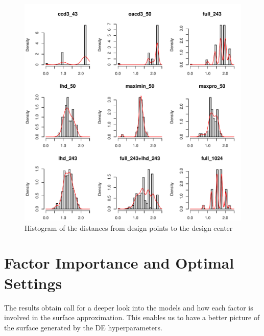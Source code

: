\documentclass [PhD] {package/uclathes}
\begin{document}
\begin{figure}%
    \centering
    \includegraphics{chapters/DE/pdfs/histogram}
    \caption{Histogram of the distances from  design points to the design center}
    \label{fig:distance}
\end{figure}


\section{Factor Importance and Optimal Settings}
The results obtain call for a deeper look into the models and how each factor is involved in the surface approximation. This enables us to have a better picture of the surface generated by the DE hyperparameters.

\end{document}
